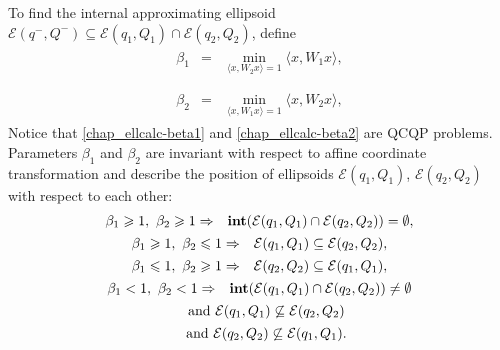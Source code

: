 \documentclass[letterpaper,10pt,english]{sphinxmanual}
\begin{document}
To find the internal approximating ellipsoid
${\mathcal E}(q^-,Q^-)\subseteq{\mathcal E}(q_1,Q_1)\cap{\mathcal E}(q_2,Q_2)$,
define
\label{chap_ellcalc:equation-beta1}\begin{gather}
\begin{split}\beta_1 & = & \min_{\langle x,W_2x\rangle=1}\langle x,W_1x\rangle,\\\end{split}\label{chap_ellcalc-beta1}
\end{gather}\label{chap_ellcalc:equation-beta2}\begin{gather}
\begin{split}\beta_2 & = & \min_{\langle x,W_1x\rangle=1}\langle x,W_2x\rangle,\end{split}\label{chap_ellcalc-beta2}
\end{gather}
Notice that \eqref{chap_ellcalc-beta1} and \eqref{chap_ellcalc-beta2} are QCQP problems. Parameters
$\beta_1$ and $\beta_2$ are invariant with respect to affine
coordinate transformation and describe the position of ellipsoids
${\mathcal E}(q_1,Q_1)$, ${\mathcal E}(q_2,Q_2)$ with
respect to each other:
\begin{gather}
\begin{split}\beta_1\geqslant1,~\beta_2\geqslant1 & \Rightarrow &
{\bf int}({\mathcal E}(q_1,Q_1)\cap{\mathcal E}(q_2,Q_2))=\emptyset, \\\end{split}\notag\\\begin{split}\beta_1\geqslant1,~\beta_2\leqslant1 & \Rightarrow & {\mathcal E}(q_1,Q_1)\subseteq{\mathcal E}(q_2,Q_2), \\\end{split}\notag\\\begin{split}\beta_1\leqslant1,~\beta_2\geqslant1 & \Rightarrow & {\mathcal E}(q_2,Q_2)\subseteq{\mathcal E}(q_1,Q_1), \\\end{split}\notag\\\begin{split}\beta_1<1,~\beta_2<1 & \Rightarrow &
{\bf int}({\mathcal E}(q_1,Q_1)\cap{\mathcal E}(q_2,Q_2))\neq\emptyset \\\end{split}\notag\\\begin{split}& & \mbox{and} ~ {\mathcal E}(q_1,Q_1)\not\subseteq{\mathcal E}(q_2,Q_2) \\\end{split}\notag\\\begin{split}& & \mbox{and} ~ {\mathcal E}(q_2,Q_2)\not\subseteq{\mathcal E}(q_1,Q_1).\end{split}\notag
\end{gather}
\end{document}
